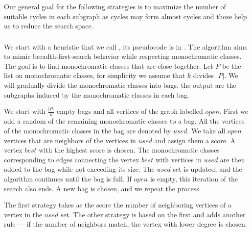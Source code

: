 Our general goal for the following strategies
is to maximize the number of suitable cycles in each
subgraph as cycles may form almost cycles and those help us
to reduce the search space.

\subsubsection{\Neighbors{}}

We start with a heuristic that we call \Neighbors{},
its pseudocode is in .
The algorithm aims to mimic breadth-first-search
behavior while respecting monochromatic classes.
The goal is to find monochromatic classes that are close together.
Let $P$ be the list on monochromatic classes,
for simplicity we assume that $k$ divides $|P|$.
We will gradually divide the monochromatic classes into bags,
the output are the subgraphs induced by the monochromatic classes in each bag.

We start with $\frac{|P|}{k}$ empty bags
and all vertices of the graph labelled $open$.
First we add a random of the remaining monochromatic classes to a bag.
All the vertices of the monochromatic classes in the bag are denoted by $used$.
We take all $open$ vertices that are neighbors of the vertices in $used$ and assign
them a score. A vertex $best$ with the highest score is chosen.
The monochromatic classes corresponding to edges connecting the vertex $best$
with vertices in $used$ are then added to the bag while not exceeding its size.
The $used$ set is updated, and the algorithm continues until the bag is full.
If $open$ is empty, this iteration of the search also ends.
A new bag is chosen, and we repeat the process.

The first strategy \Neighbors{} takes as the score the number of
neighboring vertices of a vertex in the $used$ set.
The other strategy \NeighborsDegree{} is based
on the first and adds another rule ---
if the number of neighbors match, the vertex with lower degree is chosen.

